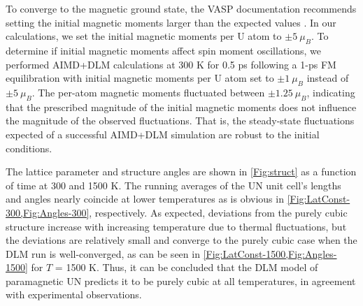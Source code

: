 \documentclass[preprint, 12pt]{elsarticle}
\newcommand{\?}{\stackrel{?}{=}}
\begin{document}
To converge to the magnetic ground state, the VASP documentation recommends setting the initial magnetic moments larger than the expected values \cite{MAGMOM}. In our calculations, we set the initial magnetic moments per U atom to $\pm 5 \ \mu_B$. To determine if initial magnetic moments affect spin moment oscillations, we performed AIMD+DLM calculations at 300 K for 0.5 ps following a 1-ps FM equilibration with initial magnetic moments per U atom set to $\pm 1 \ \mu_B$ instead of $\pm 5 \ \mu_B$. The per-atom magnetic moments fluctuated between $\pm 1.25 \ \mu_B$, indicating that the prescribed magnitude of the initial magnetic moments does not influence the magnitude of the observed fluctuations. That is, the steady-state fluctuations expected of a successful AIMD+DLM simulation are robust to the initial conditions.

The lattice parameter and structure angles are shown in \cref{Fig:struct} as a function of time at 300 and 1500 K. 
The running averages of the UN unit cell's lengths and angles nearly coincide at lower temperatures as is obvious in \cref{Fig:LatConst-300,Fig:Angles-300}, respectively. As expected, deviations from the purely cubic structure increase with increasing temperature due to thermal fluctuations, but the deviations are relatively small and converge to the purely cubic case when the DLM run is well-converged, as can be seen in \cref{Fig:LatConst-1500,Fig:Angles-1500} for $T$ = 1500 K. Thus, it can be concluded that the DLM model of paramagnetic UN predicts it to be purely cubic at all temperatures, in agreement with experimental observations. %
\end{document}
